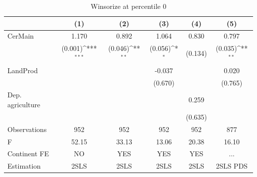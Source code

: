 \begin{table}[htbp]\centering
\def\sym#1{\ifmmode^{#1}\else\(^{#1}\)\fi}
\caption{Winsorize at percentile 0}
\begin{tabular}{l*{5}{c}}
\hline\hline
                &\multicolumn{1}{c}{(1)}         &\multicolumn{1}{c}{(2)}         &\multicolumn{1}{c}{(3)}         &\multicolumn{1}{c}{(4)}         &\multicolumn{1}{c}{(5)}         \\
\hline
CerMain         &    1.170         &    0.892         &    1.064         &    0.830         &    0.797         \\
                &  (0.001)\sym{***}&  (0.046)\sym{**} &  (0.056)\sym{*}  &  (0.134)         &  (0.035)\sym{**} \\
LandProd        &                  &                  &   -0.037         &                  &    0.020         \\
                &                  &                  &  (0.670)         &                  &  (0.765)         \\
Dep. agriculture&                  &                  &                  &    0.259         &                  \\
                &                  &                  &                  &  (0.635)         &                  \\
\hline
Observations    &      952         &      952         &      952         &      952         &      877         \\
F               &    52.15         &    33.13         &    13.06         &    20.38         &    16.10         \\
Continent FE    &       NO         &      YES         &      YES         &      YES         &      ...         \\
Estimation      &     2SLS         &     2SLS         &     2SLS         &     2SLS         & 2SLS PDS         \\
\hline\hline
\end{tabular}
\end{table}
